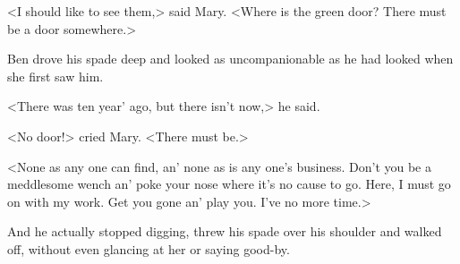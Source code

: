 <I should like to see them,> said Mary. <Where is the green door? There must be a door somewhere.>

Ben drove his spade deep and looked as uncompanionable as he had looked when she first saw him.

<There was ten year' ago, but there isn't now,> he said.

<No door!> cried Mary. <There must be.>

<None as any one can find, an' none as is any one's business. Don't you be a meddlesome wench an' poke your nose where it's no cause to go. Here, I must go on with my work. Get you gone an' play you. I've no more time.>

And he actually stopped digging, threw his spade over his shoulder and walked off, without even glancing at her or saying good-by.